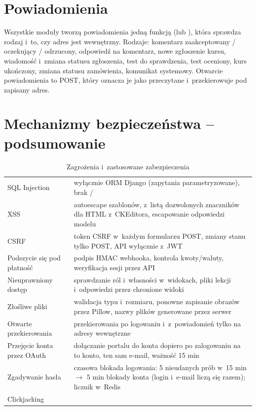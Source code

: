 \section{Powiadomienia}

Wszystkie moduły tworzą powiadomienia jedną funkcją  (lub ), która sprawdza rodzaj i~to, czy adres jest
wewnętrzny. Rodzaje: komentarz zaakceptowany / oczekujący / odrzucony, odpowiedź na
komentarz, nowe zgłoszenie kursu, wiadomość i~zmiana statusu zgłoszenia, test do
sprawdzenia, test oceniony, kurs ukończony, zmiana statusu zamówienia, komunikat
systemowy. Otwarcie powiadomienia to POST, który oznacza je jako przeczytane i~przekierowuje
pod zapisany adres.

\section{Mechanizmy bezpieczeństwa -- podsumowanie}

\begin{table}[H]
\centering\small
\caption{Zagrożenia i~zastosowane zabezpieczenia}
\begin{tabularx}{\linewidth}{@{}P{3.4cm}L@{}}
\toprule
{} &  \\
\midrule
SQL Injection & wyłącznie ORM Django (zapytania parametryzowane), brak / \\
XSS & autoescape szablonów,  z~listą dozwolonych znaczników dla HTML z~CKEditora, escapowanie odpowiedzi modelu \\
CSRF & token CSRF w~każdym formularzu POST, zmiany stanu tylko POST, API wyłącznie z~JWT \\
Podszycie się pod płatność & podpis HMAC webhooka, kontrola kwoty/waluty, weryfikacja sesji przez API \\
Nieuprawniony dostęp & sprawdzanie ról i~własności w~widokach, pliki lekcji i~odpowiedzi przez chronione widoki \\
Złośliwe pliki & walidacja typu i~rozmiaru, ponowne zapisanie obrazów przez Pillow, nazwy plików generowane przez serwer \\
Otwarte przekierowania & przekierowania po logowaniu i~z~powiadomień tylko na adresy wewnętrzne \\
Przejęcie konta przez OAuth & dołączanie portalu do konta dopiero po zalogowaniu na to konto, ten sam e-mail, ważność 15 min \\
Zgadywanie hasła & czasowa blokada logowania: 5 nieudanych prób w~15 min $\rightarrow$ 5 min blokady konta (login i~e-mail liczą się razem); licznik w~Redis \\
Clickjacking &  \\
\bottomrule
\end{tabularx}
\end{table}
